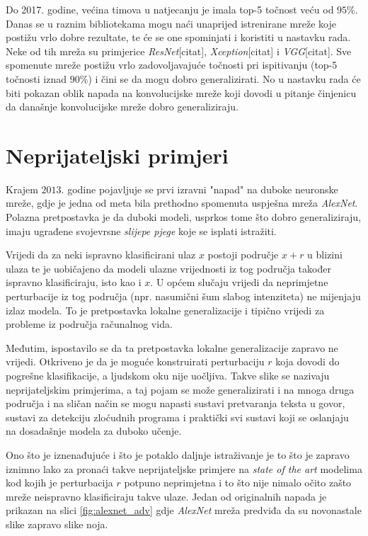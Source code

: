 \documentclass[utf8, diplomski]{fer}
\begin{document}
Do 2017. godine, većina timova u natjecanju je imala top-5 točnost veću od $95\%$. Danas se u raznim bibliotekama mogu naći unaprijed istrenirane mreže koje postižu vrlo dobre rezultate, te će se one spominjati i koristiti u nastavku rada. Neke od tih mreža su primjerice \textit{ResNet}[citat], \textit{Xception}[citat] i \textit{VGG}[citat]. Sve spomenute mreže postižu vrlo zadovoljavajuće točnosti pri ispitivanju (top-5 točnosti iznad $90\%$) i čini se da mogu dobro generalizirati. No u nastavku rada će biti pokazan oblik napada na konvolucijske mreže koji dovodi u pitanje činjenicu da današnje konvolucijske mreže dobro generaliziraju.
\section{Neprijateljski primjeri}
Krajem $2013.$ godine pojavljuje se prvi izravni "napad" na duboke neuronske mreže\citep{Szegedy2014IntriguingPO}, gdje je jedna od meta bila prethodno spomenuta uspješna mreža \textit{AlexNet}. Polazna pretpostavka je da duboki modeli, usprkos tome što dobro generaliziraju, imaju ugrađene svojevrsne \textit{slijepe pjege} koje se isplati istražiti.
\par
Vrijedi da za neki ispravno klasificirani ulaz $x$ postoji područje $x + r$ u blizini ulaza te je uobičajeno da modeli ulazne vrijednosti iz tog područja također ispravno klasificiraju, isto kao i $x$. U općem slučaju vrijedi da neprimjetne perturbacije iz tog područja (npr. nasumični šum slabog intenziteta) ne mijenjaju izlaz modela. To je pretpostavka lokalne generalizacije i tipično vrijedi za probleme iz područja računalnog vida.
\par
Međutim, ispostavilo se da ta pretpostavka lokalne generalizacije zapravo ne vrijedi. Otkriveno je da je moguće konstruirati perturbaciju $r$ koja dovodi do pogrešne klasifikacije, a ljudskom oku nije uočljiva. Takve slike se nazivaju neprijateljskim primjerima, a taj pojam se može generalizirati i na mnoga druga područja i na sličan način se mogu napasti sustavi pretvaranja teksta u govor, sustavi za detekciju zloćudnih programa i praktički svi sustavi koji se oslanjaju na dosadašnje modela za duboko učenje. 
\par
Ono što je iznenađujuće i što je potaklo daljnje istraživanje je to što je zapravo iznimno lako za pronaći takve neprijateljske primjere na \textit{state of the art} modelima kod kojih je perturbacija $r$ potpuno neprimjetna i to što nije nimalo očito zašto mreže neispravno klasificiraju takve ulaze. Jedan od originalnih napada je prikazan na slici \ref{fig:alexnet_adv} gdje \textit{AlexNet} mreža predviđa da su novonastale slike zapravo slike noja.
\end{document}

